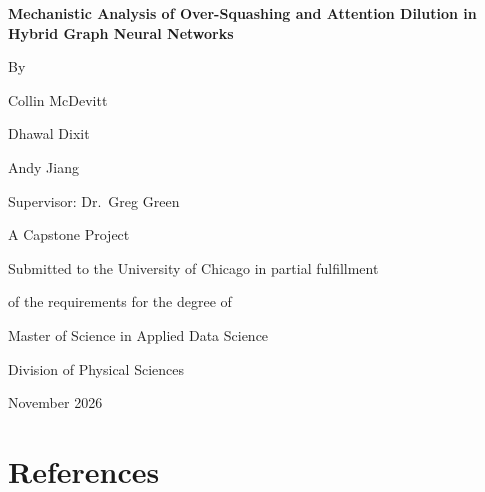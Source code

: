 \documentclass[12pt,letterpaper]{article}
\begin{document}
\begin{titlepage}
  \centering
  \vspace*{0.6in}
  {\fontsize{18}{22}\selectfont\bfseries Mechanistic Analysis of Over-Squashing and Attention Dilution in Hybrid Graph Neural Networks\par}
  \vspace{0.5in}
  {\fontsize{14}{17}\selectfont By\par}
  \vspace{0.15in}
  {\normalsize Collin McDevitt\par Dhawal Dixit\par Andy Jiang\par}
  \vspace{0.3in}
  {\normalsize Supervisor: Dr.\ Greg Green\par}
  \vspace{0.5in}
  {\fontsize{14}{17}\selectfont
   A Capstone Project\par
   \vspace{0.15in}
   Submitted to the University of Chicago in partial fulfillment\par
   of the requirements for the degree of\par
   \vspace{0.15in}
   Master of Science in Applied Data Science\par
   \vspace{0.15in}
   Division of Physical Sciences\par
   \vspace{0.3in}
   November 2026\par}
\end{titlepage}

\setcounter{page}{1}





\newpage
\section{References}
\begingroup
\singlespacing
\setlength{\parindent}{0pt}
\renewcommand{\refname}{}
\renewcommand{\section}[2]{}%
\setlength{\bibsep}{10pt}
\setlength{\bibhang}{0.5in}

\endgroup

\newpage

\end{document}
